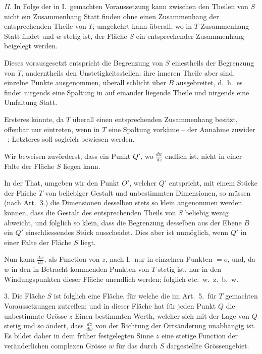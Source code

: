 \documentclass{article}
\begin{document}
\emph{II.} In Folge der in I.\ gemachten Voraussetzung kann zwischen den Theilen von $S$ nicht ein Zusammenhang Statt finden ohne einen Zusammenhang der entsprechenden Theile von $T$; umgekehrt kann überall, wo in $T$ Zusammenhang Statt findet und $w$ stetig ist, der Fläche $S$ ein entsprechender Zusammenhang beigelegt werden.

Dieses vorausgesetzt entspricht die Begrenzung von $S$ einestheils der Begrenzung von $T$, anderntheils den Unstetigkeitsstellen; ihre inneren Theile aber sind, einzelne Punkte ausgenommen, überall schlicht über $B$ ausgebreitet, d.\ h.\ es findet nirgends eine Spaltung in auf einander liegende Theile und nirgends eine Umfaltung Statt.

Ersteres könnte, da $T$ überall einen entsprechenden Zusammenhang besitzt, offenbar nur eintreten, wenn in $T$ eine Spaltung vorkäme -- der Annahme zuwider --; Letzteres soll sogleich bewiesen werden.

Wir beweisen zuvörderst, dass ein Punkt $Q'$, wo $\frac{dw}{dz}$ endlich ist, nicht in einer Falte der Fläche $S$ liegen kann.

In der That, umgeben wir den Punkt $O'$, welcher $Q'$ entspricht, mit einem Stücke der Fläche $T$ von beliebiger Gestalt und unbestimmten Dimensionen, so müssen (nach Art.~3.) die Dimensionen desselben stets so klein angenommen werden können, dass die Gestalt des entsprechenden Theils von $S$ beliebig wenig abweicht, und folglich so klein, dass die Begrenzung desselben aus der Ebene $B$ ein $Q'$ einschliessendes Stück ausscheidet. Dies aber ist unmöglich, wenn $Q'$ in einer Falte der Fläche $S$ liegt.

Nun kann $\frac{dw}{dz}$, als Function von $z$, nach I.\ nur in einzelnen Punkten $= o$, und, da $w$ in den in Betracht kommenden Punkten von $T$ stetig ist, nur in den Windungspunkten dieser Fläche unendlich werden; folglich etc.\ w.\ z.\ b.\ w.

3. Die Fläche $S$ ist folglich eine Fläche, für welche die im Art.~5.\ für $T$ gemachten Voraussetzungen zutreffen; und in dieser Fläche hat für jeden Punkt $Q$ die unbestimmte Grösse $z$ Einen bestimmten Werth, welcher sich mit der Lage von $Q$ stetig und so ändert, dass $\frac{dz}{dw}$ von der Richtung der Ortsänderung unabhängig ist. Es bildet daher in dem früher festgelegten Sinne $z$ eine stetige Function der veränderlichen complexen Grösse $w$ für das durch $S$ dargestellte Grössengebiet.
\end{document}

